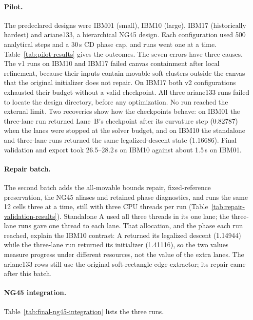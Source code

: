 \paragraph{Pilot.} The predeclared designs were IBM01 (small), IBM10 (large), IBM17
(historically hardest) and ariane133, a hierarchical NG45 design. Each configuration
used 500 analytical steps and a 30\,s CD phase cap, and runs went one at a time.
Table~\ref{tab:pilot-results} gives the outcomes. The seven errors have three causes.
The v1 runs on IBM10 and IBM17 failed canvas containment after local refinement,
because their inputs contain movable soft clusters outside the canvas that the
original initializer does not repair. On IBM17 both v2 configurations exhausted their
budget without a valid checkpoint. All three ariane133 runs failed to locate the
design directory, before any optimization. No run reached the external limit. Two
recoveries show how the checkpoints behave: on IBM01 the three-lane run returned
Lane~B's checkpoint after its curvature step (0.82787) when the lanes were stopped at
the solver budget, and on IBM10 the standalone and three-lane runs returned the same
legalized-descent state (1.16686). Final validation and export took 26.5--28.2\,s on
IBM10 against about 1.5\,s on IBM01.



\paragraph{Repair batch.} The second batch adds the all-movable bounds repair,
fixed-reference preservation, the NG45 aliases and retained phase diagnostics, and runs
the same 12 cells three at a time, still with three CPU threads per run
(Table~\ref{tab:repair-validation-results}). Standalone A used all three threads in
its one lane; the three-lane runs gave one thread to each lane. That allocation, and
the phase each run reached, explain the IBM10 contrast: A returned its legalized
descent (1.14944) while the three-lane run returned its initializer (1.41116), so the
two values measure progress under different resources, not the value of the extra
lanes. The ariane133 rows still use the original soft-rectangle edge extractor; its
repair came after this batch.



\paragraph{NG45 integration.} Table~\ref{tab:final-ng45-integration} lists the three runs.


